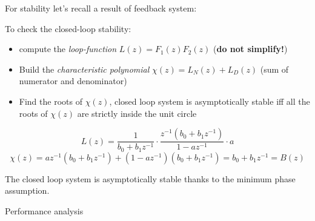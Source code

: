 
\begin{remark}
    For stability let's recall a result of feedback system:
    \begin{figure}[H]
        \centering
    \end{figure}

    To check the closed-loop stability:
    \begin{itemize}
        \item compute the \emph{loop-function} $L(z) = F_1(z) F_2(z)$ (\textbf{do not simplify!})
        \item Build the \emph{characteristic polynomial} $\chi(z) = L_N(z) + L_D(z)$ (sum of numerator and denominator)
        \item Find the roots of $\chi(z)$, closed loop system is asymptotically stable iff all the roots of $\chi(z)$ are strictly inside the unit circle
    \end{itemize}
\end{remark}

\[
    L(z) = \frac{1}{b_0+b_1z^{-1}} \cdot \frac{z^{-1}(b_0+b_1z^{-1})}{1-az^{-1}} \cdot a
\]
\[
    \chi(z) = az^{-1}(b_0+b_1z^{-1}) + (1-az^{-1})(b_0+b_1z^{-1}) = b_0+b_1z^{-1} = B(z)
\]

The closed loop system is asymptotically stable thanks to the minimum phase assumption.

Performance analysis
\begin{figure}[H]
    \centering
\end{figure}

